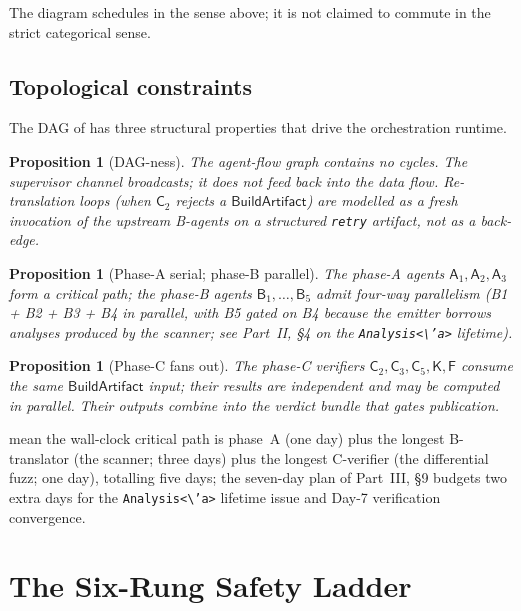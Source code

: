 \documentclass[12pt]{article}
\newtheorem{proposition}[theorem]{Proposition}
\theoremstyle{definition}
\theoremstyle{remark}
\newcommand{\Agent}[1]{\ensuremath{\mathsf{#1}}}
\newcommand{\Artifact}[1]{\ensuremath{\mathsf{#1}}}
\newcommand{\BArt}{\Artifact{BuildArtifact}}
\begin{document}
\noindent The diagram schedules in the sense above; it is not claimed
to commute in the strict categorical sense.

\subsection{Topological constraints}
\label{sec:topology}

The DAG of  has three structural properties that drive
the orchestration runtime.

\begin{proposition}[DAG-ness]
\label{prop:dag}
The agent-flow graph contains no cycles. The supervisor channel
broadcasts; it does not feed back into the data flow. Re-translation
loops (when \(\Agent{C}_2\) rejects a \BArt) are modelled as a fresh
invocation of the upstream B-agents on a structured \texttt{retry}
artifact, not as a back-edge.
\end{proposition}

\begin{proposition}[Phase-A serial; phase-B parallel]
\label{prop:phases}
The phase-A agents \(\Agent{A}_1, \Agent{A}_2, \Agent{A}_3\) form a
critical path; the phase-B agents \(\Agent{B}_1, \dots, \Agent{B}_5\)
admit four-way parallelism (B1 + B2 + B3 + B4 in parallel, with B5
gated on B4 because the emitter borrows analyses produced by the
scanner; see Part~II, \S{}4 on the \texttt{Analysis<\textbackslash 'a>}
lifetime).
\end{proposition}

\begin{proposition}[Phase-C fans out]
\label{prop:fanout}
The phase-C verifiers \(\Agent{C}_2, \Agent{C}_3, \Agent{C}_5,
\Agent{K}, \Agent{F}\) consume the same \BArt{} input; their results
are independent and may be computed in parallel. Their outputs combine
into the verdict bundle that gates publication.
\end{proposition}

 mean the wall-clock critical path is
phase~A (one day) plus the longest B-translator (the scanner; three
days) plus the longest C-verifier (the differential fuzz; one day),
totalling five days; the seven-day plan of Part~III, \S{}9 budgets
two extra days for the \texttt{Analysis<\textbackslash 'a>} lifetime
issue and Day-7 verification convergence.

\section{The Six-Rung Safety Ladder}
\label{sec:safety-ladder}
\end{document}
